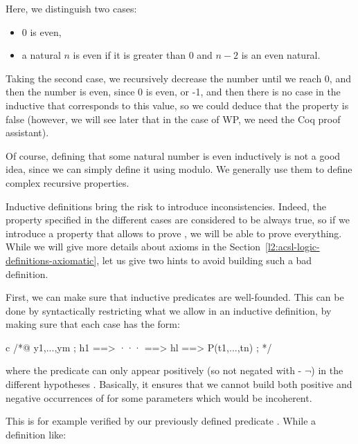 


Here, we distinguish two cases:
\begin{itemize}
\item 0 is even,
\item a natural $n$ is even if it is greater than 0 and $n-2$ is an even
      natural.
\end{itemize}

Taking the second case, we recursively decrease the number until we reach
0, and then the number is even, since 0 is even, or -1, and then there
is no case in the inductive that corresponds to this value, so we could
deduce that the property is false (however, we will see later that in the
case of WP, we need the Coq proof assistant).





Of course, defining that some natural number is even inductively is not a
good idea, since we can simply define it using modulo. We generally use them
to define complex recursive properties.


Inductive definitions bring the risk to introduce inconsistencies. Indeed, the
property specified in the different cases are considered to be always true, so
if we introduce a property that allows to prove , we will be
able to prove everything. While we will give more details about axioms in the
Section~\ref{l2:acsl-logic-definitions-axiomatic}, let us give two hints to
avoid building such a bad definition.

First, we can make sure that inductive predicates are well-founded. This can
be done by syntactically restricting what we allow in an inductive definition,
by making sure that each case has the form:

\begin{CodeBlock}{c}
/*@
  \forall y1,...,ym ; h1 ==> ··· ==> hl ==> P(t1,...,tn) ;
*/
\end{CodeBlock}

where the predicate  can only appear positively (so not negated
with \CodeInline{!} - $\neg$) in the different hypotheses .
Basically, it ensures that we cannot build both positive and negative
occurrences of  for some parameters which would be incoherent.

This is for example verified by our previously defined predicate
. While a definition like:

